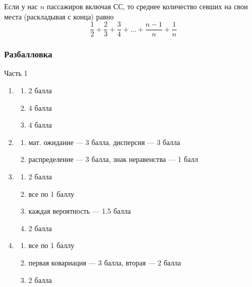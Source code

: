 \documentclass[12pt, a4paper]{article}\usepackage[]{graphicx}\usepackage[]{color}
\begin{document}
\begin{enumerate}
\begin{enumerate}
						Если у нас $n$ пассажиров включая СС, то среднее количество севших на свои места (раскладывая с конца) равно $$\frac{1}{2}+\frac{2}{3}+\frac{3}{4}+\dots+\frac{n-1}{n}+\frac{1}{n}$$

					\end{enumerate}

				\end{enumerate}





				\subsubsection*{Разбалловка}
				Часть 1

				\begin{enumerate}
					\item
					\begin{enumerate}
						\item 2 балла
						\item 4 балла
						\item 4 балла
					\end{enumerate}

					\item
					\begin{enumerate}
						\item мат. ожидание — 3 балла, дисперсия — 3 балла
						\item распределение — 3 балла, знак неравенства — 1 балл

					\end{enumerate}

					\item
					\begin{enumerate}
						\item 2 балла
						\item все по 1 баллу
						\item каждая вероятность — 1.5 балла
						\item 2 балла

					\end{enumerate}

					\item
					\begin{enumerate}
						\item все по 1 баллу
						\item первая ковариация — 3 балла, вторая — 2 балла
						\item 2 балла
					\end{enumerate}




\end{enumerate}
\end{document}
